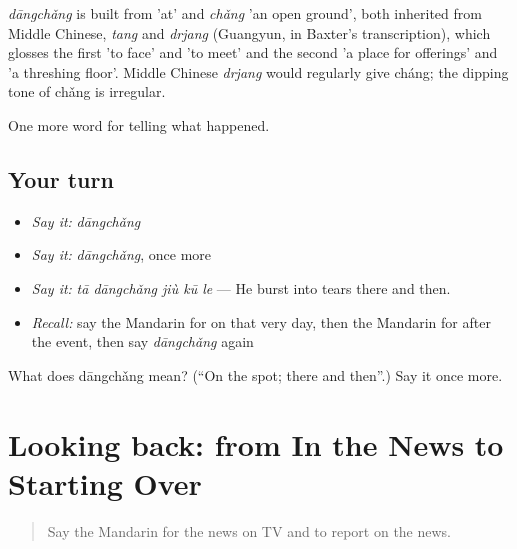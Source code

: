 \begin{cousinweb}
\emph{dāngchǎng} is built from  'at' and \emph{chǎng} 'an open ground', both inherited from Middle Chinese, \emph{tang} and \emph{drjang} (Guangyun, in Baxter's transcription), which glosses the first 'to face' and 'to meet' and the second 'a place for offerings' and 'a threshing floor'. Middle Chinese \emph{drjang} would regularly give cháng; the dipping tone of chǎng is irregular.
\end{cousinweb}

\begin{grammarlens}[title={What you've built}]
One more word for telling what happened.
\end{grammarlens}

\subsection*{Your turn}
\begin{itemize}
\raggedright
  \item \emph{Say it:} \emph{dāngchǎng}
  \item \emph{Say it:} \emph{dāngchǎng}, once more
  \item \emph{Say it:} \emph{tā dāngchǎng jiù kū le} — He burst into tears there and then.
  \item \emph{Recall:} say the Mandarin for on that very day, then the Mandarin for after the event, then say \emph{dāngchǎng} again
\end{itemize}

\begin{tcolorbox}[breakable,colback=teal!4,colframe=teal!35!black,title={Before you move on}]
What does dāngchǎng mean? (\textquotedblleft{}On the spot; there and then\textquotedblright{}.) Say it once more.
\end{tcolorbox}
\section[(dialogue)]{Looking back: from In the News to Starting Over}

\label{lesson:ZH-R295-review-290-295}



\begin{quote}
Say the Mandarin for the news on TV and to report on the news.
\end{quote}

